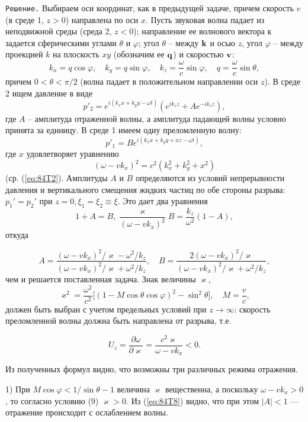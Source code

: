 \texttt{Решение.} Выбираем оси координат, как в предыдущей задаче, причем скорость $v$ (в среде 1, $z>0$) направлена по оси $x$.
Пусть звуковая волиа падает из неподвижной среды (среда 2, $z<0$);
направление ее волнового вектора к задается сферическими углами $\theta$ и $\varphi$;
угол $\theta$ -- между $\mathbf{k}$ и осью $z$, угол $\varphi$ -- между проекцией $k$ на плоскость $xy$ (обозначим ее $\mathbf{q}$) и скоростью $\mathbf{v}$:
\[
   k_x=q\cos\varphi,\quad
   k_y=q\sin\varphi,\quad
   k_z=\frac{\omega}{c}\sin\varphi,\quad
   q=\frac{\omega}{c}\sin\theta,
   \]
причем $0<\theta<\pi/2$ (волна падает в положительном направлении оси $z$).
В среде 2 ищем давление в виде
\[
p'_2 = e^{i(k_xx+k_yy-\omega t)}(e^{ik_zz}+Ae^{-ik_zz}),
\]
где $A$ -- амплитуда отраженной волны, а амплитуда падающей волны условно принята за единицу.
В среде 1 имеем одиу преломленную волну:
\[
p'_1 =Be^{i(k_xx+k_yy+xz-\omega t)},
\]
где $x$ удовлетворяет уравнению
\[
(\omega - vk_x)^2 = c^2 (k_x^2+k_y^2+x^2)
\]
(ср.  (\ref{eq:84T2}).
Амплитуды $A$ и $B$ определяются из условий непрерывности давления и вертикального смещения жидких частиц по обе стороны разрыва: $p_1' = p_2'$ при $ z = 0, \xi_1 = \xi_2 \equiv \xi.$ Это дает два уравнения
\[
    1 + A = B, \frac{\varkappa}{(\omega - vk_x)^2} B = \frac{k_z}{\omega^2}(1-A),
\]
откуда


\begin{equation}
    \label{eq:84T8}
    A = \frac{(\omega - vk_x)^2/\varkappa - \omega^2/k_z}
             {(\omega - vk_x)^2/\varkappa + \omega^2/k_z}, \quad
    B = \frac{2(\omega - vk_x)^2/\varkappa}
             {(\omega - vk_x)^2/\varkappa + \omega^2/k_z},
\end{equation}
чем и решается поставленная задача. Знак величины $\varkappa$,
\[
    \varkappa^2 = \frac{\omega^2}{c^2}
    \lbrack(1-M\cos\theta\cos\varphi)^2 - \sin^2\theta \rbrack, \quad
    M = \frac{v}{c},
\]
должен быть выбран с учетом предельных условий при $z \rightarrow \infty$: скорость преломленной волны должна быть направлена от разрыва, т.е.

\[
    U_z = \frac{\partial\omega}{\partial\varkappa} =
    \frac{c^2\varkappa}{\omega - vk_x}<0.
\]

Из полученных формул видно, что возможны три различных режима отражения.

1) При $M\cos\varphi<1/\sin\theta-1$ величина $\varkappa$ вещественна, а поскольку $\omega-vk_x>0$, то согласно условию (9) $\varkappa>0$.
Из (\ref{eq:84T8}) видно, что при этом $|A|<1$ --- отражение происходит с ослаблением волны.

